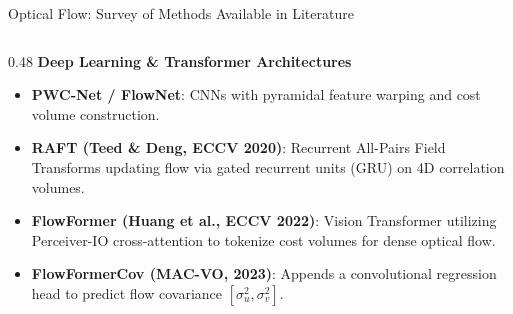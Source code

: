 \documentclass[aspectratio=169, 10pt]{beamer}
\begin{document}
\begin{frame}{Optical Flow: Survey of Methods Available in Literature}
\begin{columns}[T]
    \begin{column}{0.48\textwidth}
      {\small \textbf{\textcolor{NavyBlue}{Deep Learning \& Transformer Architectures}}}
      \vspace{0.1cm}
      \scriptsize
      \begin{itemize}
        \setlength{\itemsep}{3pt}
        \item \textbf{PWC-Net / FlowNet}: CNNs with pyramidal feature warping and cost volume construction.
        \item \textbf{RAFT (Teed \& Deng, ECCV 2020)}: Recurrent All-Pairs Field Transforms updating flow via gated recurrent units (GRU) on 4D correlation volumes.
        \item \textbf{FlowFormer (Huang et al., ECCV 2022)}: Vision Transformer utilizing Perceiver-IO cross-attention to tokenize cost volumes for dense optical flow.
        \item \textbf{FlowFormerCov (MAC-VO, 2023)}: Appends a convolutional regression head to predict flow covariance $[\sigma_u^2, \sigma_v^2]$.
      \end{itemize}
    \end{column}
  \end{columns}
\end{frame}
\end{document}
